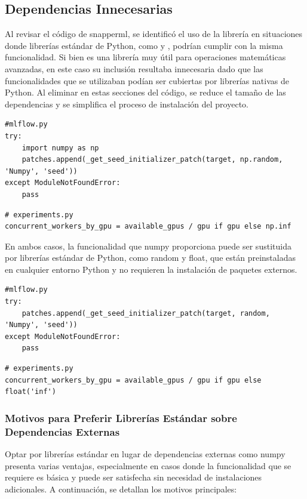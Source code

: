 \subsection{Dependencias Innecesarias}
Al revisar el código de \Gls{snapperml}, se identificó el uso de la librería  en situaciones donde librerías estándar de Python, como  y , podrían cumplir con la misma funcionalidad. Si bien  es una librería muy útil para operaciones matemáticas avanzadas, en este caso su inclusión resultaba innecesaria dado que las funcionalidades que se utilizaban podían ser cubiertas por librerías nativas de Python. Al eliminar  en estas secciones del código, se reduce el tamaño de las dependencias y se simplifica el proceso de instalación del proyecto.
\begin{verbatim}
#mlflow.py
try:
    import numpy as np
    patches.append(_get_seed_initializer_patch(target, np.random, 'Numpy', 'seed'))
except ModuleNotFoundError:
    pass
\end{verbatim}
\begin{verbatim}
# experiments.py
concurrent_workers_by_gpu = available_gpus / gpu if gpu else np.inf
\end{verbatim}

En ambos casos, la funcionalidad que numpy proporciona puede ser sustituida por librerías estándar de Python, como random y float, que están preinstaladas en cualquier entorno Python y no requieren la instalación de paquetes externos.
\begin{verbatim}
#mlflow.py
try:
    patches.append(_get_seed_initializer_patch(target, random, 'Numpy', 'seed'))
except ModuleNotFoundError:
    pass
\end{verbatim}
\begin{verbatim}
# experiments.py
concurrent_workers_by_gpu = available_gpus / gpu if gpu else float('inf')
\end{verbatim}

\subsubsection*{Motivos para Preferir Librerías Estándar sobre Dependencias Externas} Optar por librerías estándar en lugar de dependencias externas como numpy presenta varias ventajas, especialmente en casos donde la funcionalidad que se requiere es básica y puede ser satisfecha sin necesidad de instalaciones adicionales. A continuación, se detallan los motivos principales:

